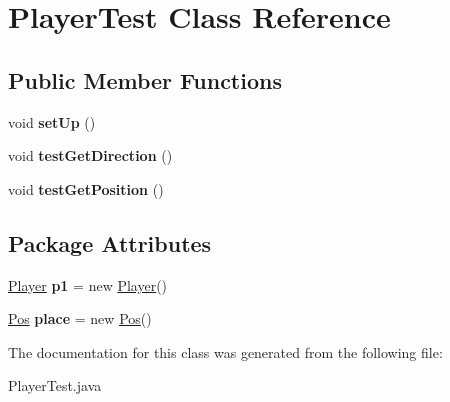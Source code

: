 \hypertarget{classPlayerTest}{
\section{PlayerTest Class Reference}
\label{classPlayerTest}
}
\subsection*{Public Member Functions}
\begin{DoxyCompactItemize}
\item 
\hypertarget{classPlayerTest_a5fc4e3940fe2442cc760b12985ceef3b}{
void {\bfseries setUp} ()}
\label{classPlayerTest_a5fc4e3940fe2442cc760b12985ceef3b}

\item 
\hypertarget{classPlayerTest_a137281e44be6f1034479f4baff010bb9}{
void {\bfseries testGetDirection} ()}
\label{classPlayerTest_a137281e44be6f1034479f4baff010bb9}

\item 
\hypertarget{classPlayerTest_afaeba768dc81d8c73de12083349d87c4}{
void {\bfseries testGetPosition} ()}
\label{classPlayerTest_afaeba768dc81d8c73de12083349d87c4}

\end{DoxyCompactItemize}
\subsection*{Package Attributes}
\begin{DoxyCompactItemize}
\item 
\hypertarget{classPlayerTest_aaba34c25e766d40bfc5c469094728fa4}{
\hyperlink{classPlayer}{Player} {\bfseries p1} = new \hyperlink{classPlayer}{Player}()}
\label{classPlayerTest_aaba34c25e766d40bfc5c469094728fa4}

\item 
\hypertarget{classPlayerTest_a8d8d12fdd1068dc0e61e80ce470584f3}{
\hyperlink{classPos}{Pos} {\bfseries place} = new \hyperlink{classPos}{Pos}()}
\label{classPlayerTest_a8d8d12fdd1068dc0e61e80ce470584f3}

\end{DoxyCompactItemize}


The documentation for this class was generated from the following file:\begin{DoxyCompactItemize}
\item 
PlayerTest.java\end{DoxyCompactItemize}
